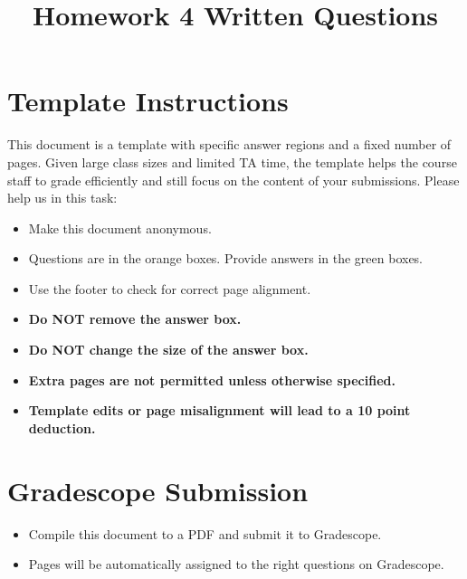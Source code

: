\pagestyle{fancy}
\fancyhf{}


\date{}

\title{Homework 4 Written Questions}



\maketitle
\thispagestyle{fancy}

\section*{Template Instructions}

This document is a template with specific answer regions and a fixed number of pages. Given large class sizes and limited TA time, the template helps the course staff to grade efficiently and still focus on the content of your submissions. Please help us in this task:
 
\begin{itemize}
  \item Make this document anonymous.
  
  \item Questions are in the orange boxes. Provide answers in the green boxes.
  \item Use the footer to check for correct page alignment.

  \item \textbf{Do NOT remove the answer box.}
  \item \textbf{Do NOT change the size of the answer box.}
  \item \textbf{Extra pages are not permitted unless otherwise specified.}
  \item \textbf{Template edits or page misalignment will lead to a 10 point deduction.}
\end{itemize}

\section*{Gradescope Submission}
\begin{itemize}
  \item Compile this document to a PDF and submit it to Gradescope.
  \item Pages will be automatically assigned to the right questions on Gradescope.
\end{itemize}

